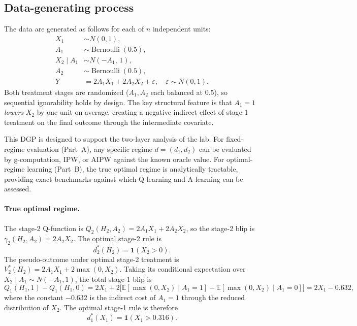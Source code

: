 \documentclass[master.tex]{subfiles}
\begin{document}
\subsection{Data-generating process}
\label{w15:sec:lab:dgp}

The data are generated as follows for each of $n$ independent units:
\begin{align*}
  X_1     &\sim N(0,1), \\
  A_1     &\sim \operatorname{Bernoulli}(0.5), \\
  X_2\mid A_1 &\sim N(-A_1,\, 1), \\
  A_2     &\sim \operatorname{Bernoulli}(0.5), \\
  Y       &= 2A_1 X_1 + 2A_2 X_2 + \varepsilon, \quad \varepsilon\sim N(0,1).
\end{align*}
Both treatment stages are randomized ($A_1, A_2$ each balanced at 0.5),
so sequential ignorability holds by design.
The key structural feature is that $A_1 = 1$ \emph{lowers} $X_2$ by one
unit on average, creating a negative indirect effect of stage-1 treatment
on the final outcome through the intermediate covariate.

This DGP is designed to support the two-layer analysis of the lab. For fixed-regime evaluation (Part~A), any specific regime $d = (d_1, d_2)$ can be evaluated by g-computation, IPW, or AIPW against the known oracle value. For optimal-regime learning (Part~B), the true optimal regime is analytically tractable, providing exact benchmarks against which Q-learning and A-learning can be assessed.

\paragraph{True optimal regime.}
The stage-2 Q-function is $Q_2(H_2, A_2) = 2A_1 X_1 + 2A_2 X_2$, so the
stage-2 blip is $\gamma_2(H_2, A_2) = 2A_2 X_2$.  The optimal stage-2 rule
is
\[
  d_2^*(H_2) = \mathbf{1}(X_2 > 0).
\]
The pseudo-outcome under optimal stage-2 treatment is $V_2^*(H_2)
= 2A_1 X_1 + 2\max(0, X_2)$.  Taking its conditional expectation over
$X_2\mid A_1 \sim N(-A_1, 1)$, the total stage-1 blip is
\[
  Q_1(H_1,1) - Q_1(H_1,0) = 2X_1
    + 2\bigl[\mathbb{E}[\max(0,X_2)\mid A_1=1]
             - \mathbb{E}[\max(0,X_2)\mid A_1=0]\bigr]
    = 2X_1 - 0.632,
\]
where the constant $-0.632$ is the indirect cost of $A_1 = 1$ through
the reduced distribution of $X_2$.  The optimal stage-1 rule is therefore
\[
  d_1^*(X_1) = \mathbf{1}(X_1 > 0.316).
\]
\end{document}
